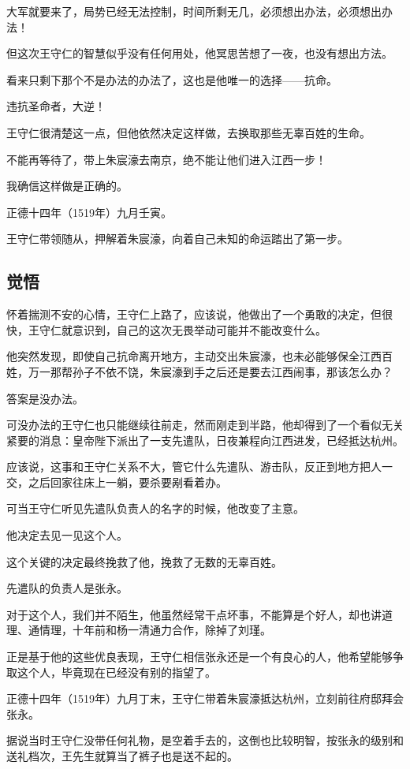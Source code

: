 \begin{multicols}{\theparacolNo}
		大军就要来了，局势已经无法控制，时间所剩无几，必须想出办法，必须想出办法！

		但这次王守仁的智慧似乎没有任何用处，他冥思苦想了一夜，也没有想出方法。

		看来只剩下那个不是办法的办法了，这也是他唯一的选择——抗命。

		违抗圣命者，大逆！

		王守仁很清楚这一点，但他依然决定这样做，去换取那些无辜百姓的生命。

		不能再等待了，带上朱宸濠去南京，绝不能让他们进入江西一步！

		我确信这样做是正确的。

		正德十四年（1519年）九月壬寅。

		王守仁带领随从，押解着朱宸濠，向着自己未知的命运踏出了第一步。

		\subsection{觉悟}
		怀着揣测不安的心情，王守仁上路了，应该说，他做出了一个勇敢的决定，但很快，王守仁就意识到，自己的这次无畏举动可能并不能改变什么。

		他突然发现，即使自己抗命离开地方，主动交出朱宸濠，也未必能够保全江西百姓，万一那帮孙子不依不饶，朱宸濠到手之后还是要去江西闹事，那该怎么办？

		答案是没办法。

		可没办法的王守仁也只能继续往前走，然而刚走到半路，他却得到了一个看似无关紧要的消息：皇帝陛下派出了一支先遣队，日夜兼程向江西进发，已经抵达杭州。

		应该说，这事和王守仁关系不大，管它什么先遣队、游击队，反正到地方把人一交，之后回家往床上一躺，要杀要剐看着办。

		可当王守仁听见先遣队负责人的名字的时候，他改变了主意。

		他决定去见一见这个人。

		这个关键的决定最终挽救了他，挽救了无数的无辜百姓。

		先遣队的负责人是张永。

		对于这个人，我们并不陌生，他虽然经常干点坏事，不能算是个好人，却也讲道理、通情理，十年前和杨一清通力合作，除掉了刘瑾。

		正是基于他的这些优良表现，王守仁相信张永还是一个有良心的人，他希望能够争取这个人，毕竟现在已经没有别的指望了。

		正德十四年（1519年）九月丁末，王守仁带着朱宸濠抵达杭州，立刻前往府邸拜会张永。

		据说当时王守仁没带任何礼物，是空着手去的，这倒也比较明智，按张永的级别和送礼档次，王先生就算当了裤子也是送不起的。


\end{multicols}
